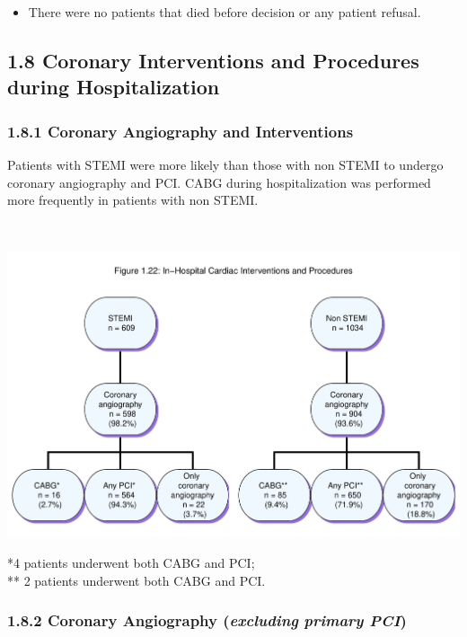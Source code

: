 \documentclass[
]{article}
\providecommand{\tightlist}{%
  \setlength{\itemsep}{0pt}\setlength{\parskip}{0pt}}
\begin{document}
\begin{itemize}
\tightlist
\item
  There were no patients that died before decision or any patient
  refusal.
\end{itemize}

\pagebreak

\subsection{1.8 Coronary Interventions and Procedures during
Hospitalization}\label{coronary-interventions-and-procedures-during-hospitalization}

\subsubsection{1.8.1 Coronary Angiography and
Interventions}\label{coronary-angiography-and-interventions}

Patients with STEMI were more likely than those with non STEMI to
undergo coronary angiography and PCI. CABG during hospitalization was
performed more frequently in patients with non STEMI.

~

\includegraphics{‏‏ACSIS_2024_v1_with_trend_pdf_files/figure-latex/unnamed-chunk-73-1.pdf}

*4 patients underwent both CABG and PCI;\\
** 2 patients underwent both CABG and PCI.

\pagebreak

\subsubsection{\texorpdfstring{1.8.2 Coronary Angiography
(\textbf{\emph{excluding}} \emph{primary
PCI})}{1.8.2 Coronary Angiography (excluding primary PCI)}}\label{coronary-angiography-excluding-primary-pci}
\end{document}

